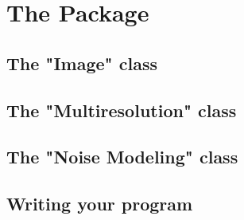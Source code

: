 \chapter{The \proj Package}
\label{ch_package}


\section{The "Image" class}
\section{The "Multiresolution" class}
\section{The "Noise Modeling" class}
\section{Writing your program}
